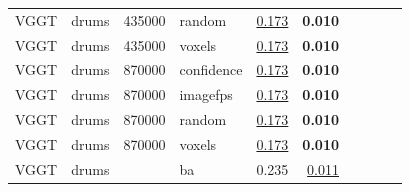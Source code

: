 \begin{table}[H]
\begin{tabular}{llrlrrrrrr}
VGGT & drums & 435000 & random & \underline{0.173} & \textbf{0.010} &  &  &  &  \\
VGGT & drums & 435000 & voxels & \underline{0.173} & \textbf{0.010} &  &  &  &  \\
VGGT & drums & 870000 & confidence & \underline{0.173} & \textbf{0.010} &  &  &  &  \\
VGGT & drums & 870000 & imagefps & \underline{0.173} & \textbf{0.010} &  &  &  &  \\
VGGT & drums & 870000 & random & \underline{0.173} & \textbf{0.010} &  &  &  &  \\
VGGT & drums & 870000 & voxels & \underline{0.173} & \textbf{0.010} &  &  &  &  \\
VGGT & drums &  & ba & 0.235 & \underline{0.011} &  &  &  &  \\
\bottomrule
\end{tabular}
\end{table}